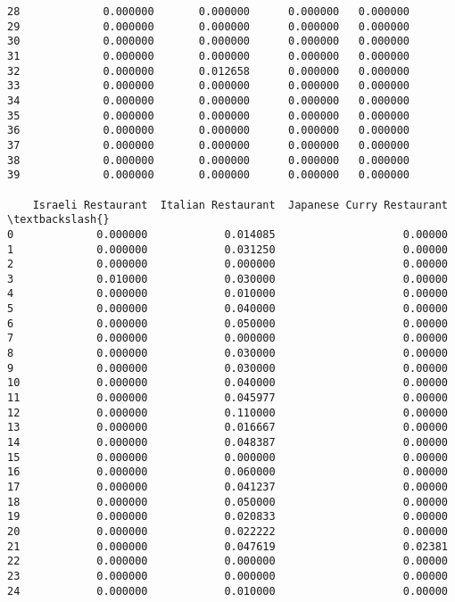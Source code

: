 \documentclass[11pt]{article}
\begin{document}
\begin{tcolorbox}[breakable, size=fbox, boxrule=.5pt, pad at break*=1mm, opacityfill=0]
\begin{Verbatim}[commandchars=\\\{\}]
28             0.000000       0.000000      0.000000   0.000000
29             0.000000       0.000000      0.000000   0.000000
30             0.000000       0.000000      0.000000   0.000000
31             0.000000       0.000000      0.000000   0.000000
32             0.000000       0.012658      0.000000   0.000000
33             0.000000       0.000000      0.000000   0.000000
34             0.000000       0.000000      0.000000   0.000000
35             0.000000       0.000000      0.000000   0.000000
36             0.000000       0.000000      0.000000   0.000000
37             0.000000       0.000000      0.000000   0.000000
38             0.000000       0.000000      0.000000   0.000000
39             0.000000       0.000000      0.000000   0.000000

    Israeli Restaurant  Italian Restaurant  Japanese Curry Restaurant  \textbackslash{}
0             0.000000            0.014085                    0.00000
1             0.000000            0.031250                    0.00000
2             0.000000            0.000000                    0.00000
3             0.010000            0.030000                    0.00000
4             0.000000            0.010000                    0.00000
5             0.000000            0.040000                    0.00000
6             0.000000            0.050000                    0.00000
7             0.000000            0.000000                    0.00000
8             0.000000            0.030000                    0.00000
9             0.000000            0.030000                    0.00000
10            0.000000            0.040000                    0.00000
11            0.000000            0.045977                    0.00000
12            0.000000            0.110000                    0.00000
13            0.000000            0.016667                    0.00000
14            0.000000            0.048387                    0.00000
15            0.000000            0.000000                    0.00000
16            0.000000            0.060000                    0.00000
17            0.000000            0.041237                    0.00000
18            0.000000            0.050000                    0.00000
19            0.000000            0.020833                    0.00000
20            0.000000            0.022222                    0.00000
21            0.000000            0.047619                    0.02381
22            0.000000            0.000000                    0.00000
23            0.000000            0.000000                    0.00000
24            0.000000            0.010000                    0.00000

\end{Verbatim}
\end{tcolorbox}
\end{document}
